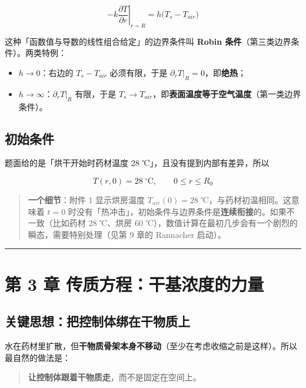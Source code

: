 \begin{equation}
-k\left.\frac{\partial T}{\partial r}\right|_{r=R}=h\big(T_s-T_{air}\big)\tag{2.3}
\end{equation}


这种「函数值与导数的线性组合给定」的边界条件叫 \textbf{Robin 条件}（第三类边界条件）。两类特例：


\begin{itemize}
\item $h\to0$：右边的 $T_s-T_{air}$ 必须有限，于是 $\partial_rT|_R=0$，即\textbf{绝热}；
\item $h\to\infty$：$\partial_rT|_R$ 有限，于是 $T_s\to T_{air}$，即\textbf{表面温度等于空气温度}（第一类边界条件）。
\end{itemize}


\subsection{初始条件}


题面给的是「烘干开始时药材温度 28 ℃」，且没有提到内部有差异，所以


\begin{equation}
T(r,0)=28\ \mathrm{^\circ C},\qquad 0\le r\le R_0\tag{2.4}
\end{equation}


\begin{quote}
\textbf{一个细节}：附件 1 显示烘房温度 $T_{air}(0)=28$ ℃，与药材初温相同。这意味着 $t=0$ 时没有「热冲击」，初始条件与边界条件是\textbf{连续衔接}的。如果不一致（比如药材 28 ℃、烘房 60 ℃），数值计算在最初几步会有一个剧烈的瞬态，需要特别处理（见第 9 章的 Rannacher 启动）。
\end{quote}


\vspace{1mm}\hrule\vspace{1mm}


\section{第 3 章 传质方程：干基浓度的力量}


\subsection{关键思想：把控制体绑在干物质上}


水在药材里扩散，但\textbf{干物质骨架本身不移动}（至少在考虑收缩之前是这样）。所以最自然的做法是：


\begin{quote}
\textbf{让控制体跟着干物质走}，而不是固定在空间上。
\end{quote}


